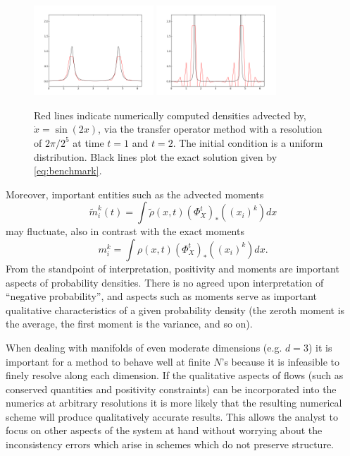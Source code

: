 \documentclass[a4paper, 12 pt]{amsart}
\begin{document}
  \begin{figure}[h!]
	\centering
  	\includegraphics[width=0.4\textwidth]{./images/transfer_op_t1_00.png}
  	\includegraphics[width=0.4\textwidth]{./images/transfer_op_t2_00.png}
	\caption{Red lines indicate numerically computed densities advected by, $\dot{x} = \sin(2x)$, via the transfer operator method with a resolution of $2\pi / 2^5$
		at time $t=1$ and $t=2$. The initial condition is a uniform distribution.
		Black lines plot the exact solution given by \eqref{eq:benchmark}.}
	\label{fig:transfer_op}
\end{figure}
  
  Moreover, important entities such as the advected moments
  $$\tilde{m}^k_i(t) = \int \tilde{\rho}(x,t) (\Phi_X^t)_*((x_i)^k)dx$$
  may fluctuate, also in contrast with the exact moments
  $$m^k_i = \int \rho(x,t)  (\Phi_X^t)_*((x_i)^k) dx.$$
  From the standpoint of interpretation, positivity and moments are important
  aspects of probability densities.  There is no agreed upon interpretation of
  ``negative probability'', and aspects such as moments serve as important
  qualitative characteristics of a given probability density (the zeroth moment
  is the average, the first moment is the variance, and so on).
  
  When dealing with manifolds of even moderate dimensions
  (e.g. $d=3$) it is important for a method to behave well at finite $N$'s
  because it is infeasible to finely resolve along each dimension.
  If the qualitative aspects of flows (such as conserved quantities and positivity
  constraints) can be incorporated into the numerics at arbitrary resolutions
  it is more likely that the resulting numerical scheme will produce qualitatively
  accurate results.
  This allows the analyst to focus on other aspects of the system at hand
  without worrying about the inconsistency errors which arise in schemes
  which do not preserve structure.
\end{document}
